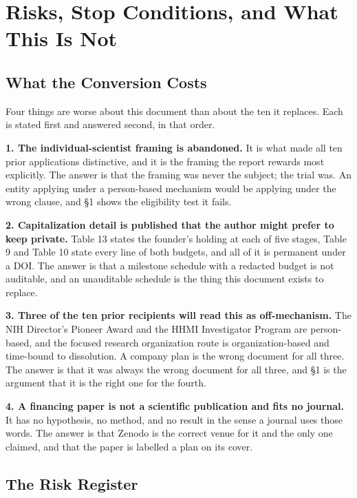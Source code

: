 \section{Risks, Stop Conditions, and What This Is Not}

\subsection{What the Conversion Costs}

Four things are worse about this document than about the ten it replaces. Each
is stated first and answered second, in that order.

\textbf{1. The individual-scientist framing is abandoned.} It is what made all
ten prior applications distinctive, and it is the framing the report rewards
most explicitly. The answer is that the framing was never the subject; the trial
was. An entity applying under a person-based mechanism would be applying under
the wrong clause, and \S1 shows the eligibility test it fails.

\textbf{2. Capitalization detail is published that the author might prefer to
keep private.} Table 13 states the founder's holding at each of five stages,
Table 9 and Table 10 state every line of both budgets, and all of it is
permanent under a DOI. The answer is that a milestone schedule with a redacted
budget is not auditable, and an unauditable schedule is the thing this document
exists to replace.

\textbf{3. Three of the ten prior recipients will read this as off-mechanism.}
The NIH Director's Pioneer Award and the HHMI Investigator Program are
person-based, and the focused research organization route is
organization-based and time-bound to dissolution. A company plan is the wrong
document for all three. The answer is that it was always the wrong document for
all three, and \S1 is the argument that it is the right one for the fourth.

\textbf{4. A financing paper is not a scientific publication and fits no
journal.} It has no hypothesis, no method, and no result in the sense a journal
uses those words. The answer is that Zenodo is the correct venue for it and the
only one claimed, and that the paper is labelled a plan on its cover.

\subsection{The Risk Register}


